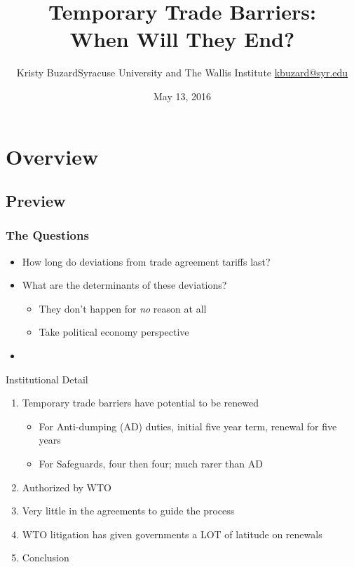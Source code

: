 \documentclass[handout]{beamer}
\title[Temporary Trade Barriers: When Will They End?\hspace{2.35in}\insertframenumber/\inserttotalframenumber]{Temporary Trade Barriers: \\ When Will They End?}
\author[Kristy Buzard]{\texorpdfstring{Kristy Buzard\newline Syracuse University and The Wallis Institute  \newline\url{kbuzard@syr.edu}}{Kristy Buzard}}
\date{May 13, 2016}
\begin{document}
\maketitle




\section{Overview}
\subsection{Preview}
\begin{frame}
\frametitle{The Questions}
\pause
\begin{itemize}[<+->]
	\item How long do deviations from trade agreement tariffs last? 
  \item What are the determinants of these deviations?
		\begin{itemize}
			\item They don't happen for \textit{no} reason at all
			\item Take political economy perspective
		\end{itemize}
	\item 
\end{itemize}
\end{frame}


\begin{frame}{Institutional Detail}
\begin{enumerate}[<+->]
	\item Temporary trade barriers have potential to be renewed
		\begin{itemize}
			\item For Anti-dumping (AD) duties, initial five year term, renewal for five years
			\item For Safeguards, four then four; much rarer than AD
		\end{itemize}
	\item Authorized by WTO
	\item Very little in the agreements to guide the process
	\item WTO litigation has given governments a LOT of latitude on renewals
	\item Conclusion
\end{enumerate}
\end{frame}
\end{document}
